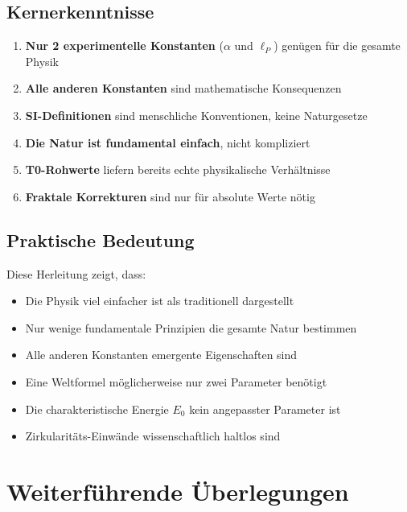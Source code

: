 \documentclass[12pt,a4paper]{article}
\theoremstyle{definition}
\begin{document}
	\subsection{Kernerkenntnisse}
	
	\begin{tcolorbox}[colback=yellow!10!white,colframe=orange!75!black,title=Revolution\"are Einfachheit]
		\begin{enumerate}
			\item \textbf{Nur 2 experimentelle Konstanten} ($\alpha$ und $\ell_P$) gen\"ugen f\"ur die gesamte Physik
			\item \textbf{Alle anderen Konstanten} sind mathematische Konsequenzen
			\item \textbf{SI-Definitionen} sind menschliche Konventionen, keine Naturgesetze
			\item \textbf{Die Natur ist fundamental einfach}, nicht kompliziert
			\item \textbf{T0-Rohwerte} liefern bereits echte physikalische Verh\"altnisse
			\item \textbf{Fraktale Korrekturen} sind nur f\"ur absolute Werte n\"otig
		\end{enumerate}
	\end{tcolorbox}
	
	\subsection{Praktische Bedeutung}
	
	Diese Herleitung zeigt, dass:
	
	\begin{itemize}
		\item Die Physik viel einfacher ist als traditionell dargestellt
		\item Nur wenige fundamentale Prinzipien die gesamte Natur bestimmen
		\item Alle anderen Konstanten emergente Eigenschaften sind
		\item Eine Weltformel m\"oglicherweise nur zwei Parameter ben\"otigt
		\item Die charakteristische Energie $E_0$ kein angepasster Parameter ist
		\item Zirkularit\"ats-Einw\"ande wissenschaftlich haltlos sind
	\end{itemize}
	
	\section{Weiterf\"uhrende \"Uberlegungen}
	
\end{document}
